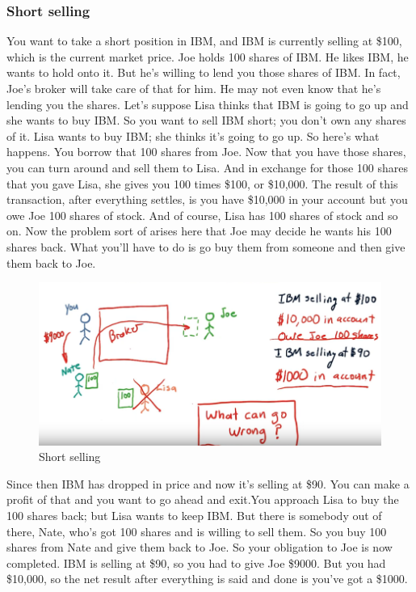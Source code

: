 \documentclass[12pt]{article}
\begin{document}
\subsubsection{Short selling}

You want to take a short position in IBM, and IBM is currently selling at \$100, which is the current market price. Joe holds 100 shares of IBM. He likes IBM, he wants to hold onto it. But he's willing to lend you those shares of IBM. In fact, Joe's broker will take care of that for him. He may not even know that he's lending you the shares. Let's suppose Lisa thinks that IBM is going to go up and she wants to buy IBM. So you want to sell IBM short; you don't own any shares of it. Lisa wants to buy IBM; she thinks it's going to go up. So here's what happens. You borrow that 100 shares from Joe. Now that you have those shares, you can turn around and sell them to Lisa. And in exchange for those 100 shares that you gave Lisa, she gives you 100 times \$100, or \$10,000. The result of this transaction, after everything settles, is you have \$10,000 in your account but you owe Joe 100 shares of stock. And of course, Lisa has 100 shares of stock and so on. Now the problem sort of arises here that Joe may decide he wants his 100 shares back. What you'll have to do is go buy them from someone and then give them back to Joe. 

\begin{figure}[!ht]
\centering
\includegraphics[scale=0.45]{fig/fig33}
\caption{Short selling}
\end{figure}

Since then IBM has dropped in price and now it's selling at \$90. You can make a profit of that and you want to go ahead and exit.You approach Lisa to buy the 100 shares back; but Lisa wants to keep IBM. But there is somebody out of there, Nate, who's got 100 shares and is willing to sell them. So you buy 100 shares from Nate and give them back to Joe. So your obligation to Joe is now completed. IBM is selling at \$90, so you had to give Joe \$9000. But you had \$10,000, so the net result after everything is said and done is you've got a \$1000. 
\end{document}
